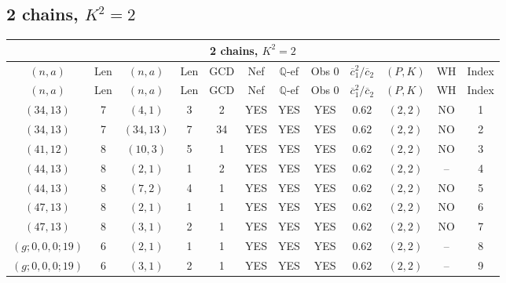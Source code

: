 \subsection{2 chains, $K^2 = 2$}
\begin{longtable}{|c|c|c|c|c|c|c|c|c|c|c|c|}
\hline
\multicolumn{12}{|c|}{2 chains, $K^2 = 2$}\\
\hline
$(n,a)$ & Len & $(n,a)$ & Len & GCD & Nef & $\mathbb Q$-ef & Obs 0 & $\overline c_1^2 / \overline c_2$ & $(P,K)$ & WH & Index\\
\hline
\endfirsthead

\hline
$(n,a)$ & Len & $(n,a)$ & Len & GCD & Nef & $\mathbb Q$-ef & Obs 0 & $\overline c_1^2 / \overline c_2$ & $(P,K)$ & WH & Index\\
\hline
\endhead
\hline
\endfoot

$(34,13)$ & 7 & $(4,1)$ & 3 & 2 & YES & YES & YES & $0.62$ & $(2,2)$ & NO & 1\\
$(34,13)$ & 7 & $(34,13)$ & 7 & 34 & YES & YES & YES & $0.62$ & $(2,2)$ & NO & 2\\
$(41,12)$ & 8 & $(10,3)$ & 5 & 1 & YES & YES & YES & $0.62$ & $(2,2)$ & NO & 3\\
$(44,13)$ & 8 & $(2,1)$ & 1 & 2 & YES & YES & YES & $0.62$ & $(2,2)$ & -- & 4\\
$(44,13)$ & 8 & $(7,2)$ & 4 & 1 & YES & YES & YES & $0.62$ & $(2,2)$ & NO & 5\\
$(47,13)$ & 8 & $(2,1)$ & 1 & 1 & YES & YES & YES & $0.62$ & $(2,2)$ & NO & 6\\
$(47,13)$ & 8 & $(3,1)$ & 2 & 1 & YES & YES & YES & $0.62$ & $(2,2)$ & NO & 7\\
$(g;0,0,0;19)$ & 6 & $(2,1)$ & 1 & 1 & YES & YES & YES & $0.62$ & $(2,2)$ & -- & 8\\
$(g;0,0,0;19)$ & 6 & $(3,1)$ & 2 & 1 & YES & YES & YES & $0.62$ & $(2,2)$ & -- & 9
\end{longtable}
